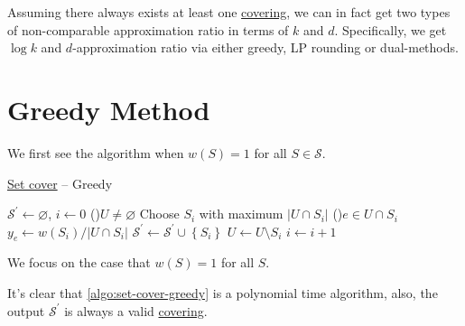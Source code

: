 Assuming there always exists at least one \hyperref[def:covering]{covering}, we can in fact get two types of non-comparable approximation ratio in terms of \(k\) and \(d\). Specifically, we get \(\log k\) and \(d\)-approximation ratio via either greedy, LP rounding or dual-methods.

\section{Greedy Method}
We first see the algorithm when \(w(S) = 1\) for all \(S\in \mathcal{S} \).

\begin{algorithm}[H]\label{algo:set-cover-greedy}
	\DontPrintSemicolon
	\caption{\hyperref[prb:set-cover]{Set cover} -- Greedy}
	\BlankLine

	\(\mathcal{S} ^\prime \gets \varnothing \), \(i\gets 0\)\;
	\While(){\(U \neq \varnothing \)}{
		Choose \(S_i\) with maximum \(\left\vert U \cap S_i \right\vert\)
		\For(){\(e\in U \cap S_i\) }{
			\(y_e \gets w(S_{i}) / \left\vert U \cap S_i \right\vert \)
		}
		\(\mathcal{S} ^\prime \gets \mathcal{S} ^\prime \cup \left\{ S_i \right\} \)\;
		\(U\gets U\setminus S_i\)\;\label{line5:algo:set-cover-greedy}
		\(i\gets i+1\)\;
	}
	\;
\end{algorithm}

We focus on the case that \(w(S) = 1\) for all \(S\).

\begin{remark}
	It's clear that \autoref{algo:set-cover-greedy} is a polynomial time algorithm, also, the output \(\mathcal{S} ^\prime \) is always a valid \hyperref[def:covering]{covering}.
\end{remark}

